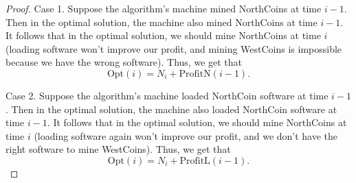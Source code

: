 \documentclass[11pt]{article}
\newcommand{\pn}{\textrm{ProfitN}}
\newcommand{\pl}{\textrm{ProfitL}}
\newcommand{\opt}{\textrm{Opt}}
\begin{document}
\begin{enumerate}
\begin{proof}
Case 1. Suppose the algorithm's machine mined NorthCoins at time $i-1$. Then in the optimal solution, the machine also mined NorthCoins at time $i-1$. It follows that in the optimal solution, we should mine NorthCoins at time $i$ (loading software won't improve our profit, and mining WestCoins is impossible because we have the wrong software). Thus, we get that
\[ \opt(i) = N_i + \pn(i-1).\]

Case 2. Suppose the algorithm's machine loaded NorthCoin software at time $i-1$. Then in the optimal solution, the machine also loaded NorthCoin software at time $i-1$. It follows that in the optimal solution, we should mine NorthCoins at time $i$ (loading software again won't improve our profit, and we don't have the right software to mine WestCoins). Thus, we get that
\[ \opt(i) = N_i + \pl(i-1).\]


\end{proof}
\end{enumerate}
\end{document}
